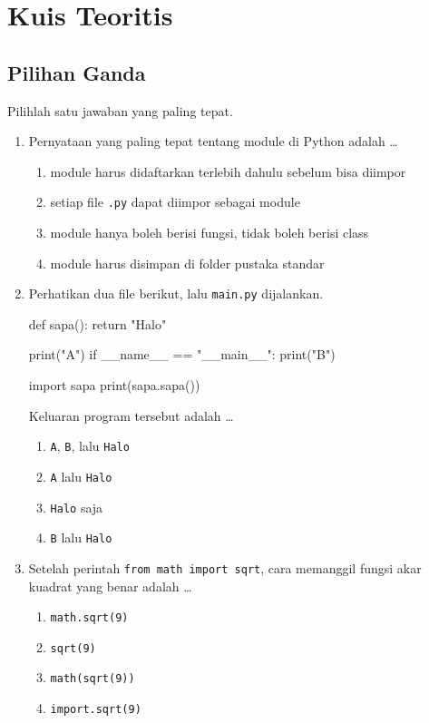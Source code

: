 \section{Kuis Teoritis}

\subsection{Pilihan Ganda}

Pilihlah satu jawaban yang paling tepat.

\begin{enumerate}
  \item Pernyataan yang paling tepat tentang module di Python adalah \ldots
  \begin{enumerate}[label=\alph*.,itemsep=0pt]
    \item module harus didaftarkan terlebih dahulu sebelum bisa diimpor
    \item setiap file \texttt{.py} dapat diimpor sebagai module
    \item module hanya boleh berisi fungsi, tidak boleh berisi class
    \item module harus disimpan di folder pustaka standar
  \end{enumerate}

  \item Perhatikan dua file berikut, lalu \texttt{main.py} dijalankan.
\begin{kode}[sapa.py]
def sapa():
    return "Halo"

print("A")
if __name__ == "__main__":
    print("B")
\end{kode}
\begin{kode}[main.py]
import sapa
print(sapa.sapa())
\end{kode}
  Keluaran program tersebut adalah \ldots
  \begin{enumerate}[label=\alph*.,itemsep=0pt]
    \item \texttt{A}, \texttt{B}, lalu \texttt{Halo}
    \item \texttt{A} lalu \texttt{Halo}
    \item \texttt{Halo} saja
    \item \texttt{B} lalu \texttt{Halo}
  \end{enumerate}

  \item Setelah perintah \texttt{from math import sqrt}, cara memanggil fungsi akar kuadrat yang benar adalah \ldots
  \begin{enumerate}[label=\alph*.,itemsep=0pt]
    \item \texttt{math.sqrt(9)}
    \item \texttt{sqrt(9)}
    \item \texttt{math(sqrt(9))}
    \item \texttt{import.sqrt(9)}
  \end{enumerate}


\end{enumerate}

